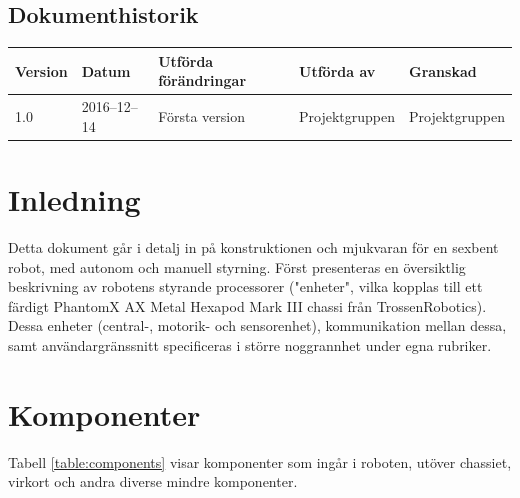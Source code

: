 \documentclass[a4paper,titlepage,12pt]{article}
\begin{document}
\begin{center}

		\section*{Dokumenthistorik}
		\renewcommand*{\arraystretch}{1.4}
        \begin{longtable}[c]{ l l >{\raggedright}p{5cm} >{\raggedright}p{3cm} l }
			\textbf{Version} & \textbf{Datum} & \textbf{Utförda förändringar} 
			& \textbf{Utförda av} & \textbf{Granskad} \\ \midrule
			
			1.0 & 2016--12--14 & Första version & Projektgruppen &
            Projektgruppen \\
            
		\end{longtable}
	\end{center}


	\newpage

	\raggedright

	\setcounter{table}{0}

	\section{Inledning}
	Detta dokument går i detalj in på konstruktionen och mjukvaran för en 
	sexbent robot, med autonom och manuell styrning. Först presenteras en 
	översiktlig beskrivning av robotens styrande processorer ("enheter", vilka kopplas till ett färdigt 
	PhantomX AX Metal Hexapod Mark III chassi från TrossenRobotics). Dessa enheter (central-, 
	motorik- och sensorenhet), kommunikation mellan dessa, samt användargränssnitt specificeras 
	i större noggrannhet under egna rubriker.
	
	\section{Komponenter}
	
	Tabell \ref{table:components} visar komponenter som ingår i
	roboten, utöver chassiet, virkort och andra diverse
	mindre komponenter.
	
\end{document}

